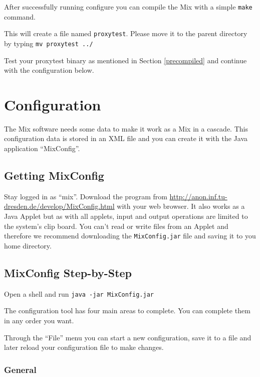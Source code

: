 \documentclass{article}
\begin{document}
After successfully running configure you can compile the Mix with a simple 
\verb|make| command.

This will create a file named \verb|proxytest|. Please move it to the
parent directory by typing \verb|mv proxytest ../|

Test your proxytest binary as mentioned in Section \ref{precompiled} and continue 
with the configuration below.


\section{Configuration} 


The Mix software needs some data to make it work as a Mix in a
cascade. This configuration data is stored in an XML file and you can
create it with the Java application ``MixConfig''.

\subsection{Getting MixConfig}

Stay logged in as ``mix''. Download the program from
\url{http://anon.inf.tu-dresden.de/develop/MixConfig.html} with your
web browser. It also works as a Java Applet but as with all applets,
input and output operations are limited to the system's clip board.
You can't read or write files from an Applet and therefore we recommend
downloading the \verb|MixConfig.jar| file and saving it to you home
directory.

\subsection{MixConfig Step-by-Step}

Open a shell and run \verb|java -jar MixConfig.jar|

The configuration tool has four main areas to complete.
You can complete them in any order you want.

Through the ``File'' menu you can start a new configuration, save it
to a file and later reload your configuration file to make changes.

\subsubsection{General}
\end{document}

